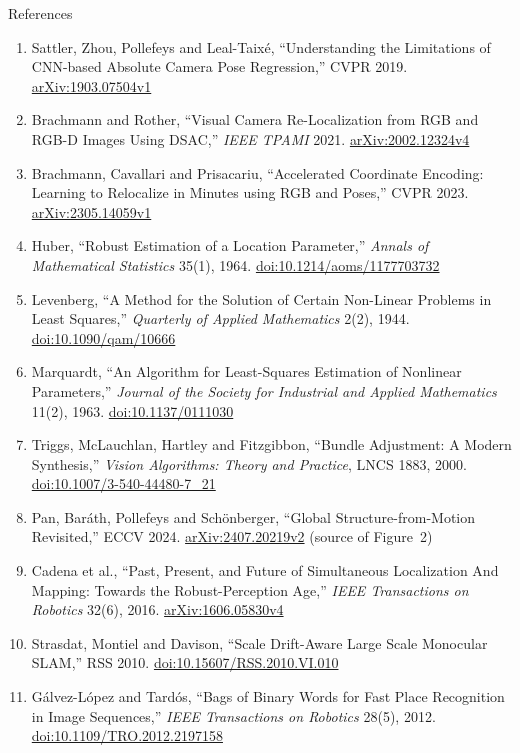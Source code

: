\begin{frame}[allowframebreaks]{References}
\begin{enumerate}
    \item Sattler, Zhou, Pollefeys and Leal-Taix\'e, ``Understanding the Limitations of CNN-based Absolute Camera Pose Regression,'' CVPR 2019. \href{https://arxiv.org/abs/1903.07504v1}{arXiv:1903.07504v1}
    \item Brachmann and Rother, ``Visual Camera Re-Localization from RGB and RGB-D Images Using DSAC,'' \emph{IEEE TPAMI} 2021. \href{https://arxiv.org/abs/2002.12324v4}{arXiv:2002.12324v4}
    \item Brachmann, Cavallari and Prisacariu, ``Accelerated Coordinate Encoding: Learning to Relocalize in Minutes using RGB and Poses,'' CVPR 2023. \href{https://arxiv.org/abs/2305.14059v1}{arXiv:2305.14059v1}
    \item Huber, ``Robust Estimation of a Location Parameter,'' \emph{Annals of Mathematical Statistics} 35(1), 1964. \href{https://doi.org/10.1214/aoms/1177703732}{doi:10.1214/aoms/1177703732}
    \item Levenberg, ``A Method for the Solution of Certain Non-Linear Problems in Least Squares,'' \emph{Quarterly of Applied Mathematics} 2(2), 1944. \href{https://doi.org/10.1090/qam/10666}{doi:10.1090/qam/10666}
    \item Marquardt, ``An Algorithm for Least-Squares Estimation of Nonlinear Parameters,'' \emph{Journal of the Society for Industrial and Applied Mathematics} 11(2), 1963. \href{https://doi.org/10.1137/0111030}{doi:10.1137/0111030}
    \item Triggs, McLauchlan, Hartley and Fitzgibbon, ``Bundle Adjustment: A Modern Synthesis,'' \emph{Vision Algorithms: Theory and Practice}, LNCS 1883, 2000. \href{https://doi.org/10.1007/3-540-44480-7_21}{doi:10.1007/3-540-44480-7\_21}
    \item Pan, Bar\'ath, Pollefeys and Sch\"onberger, ``Global Structure-from-Motion Revisited,'' ECCV 2024. \href{https://arxiv.org/abs/2407.20219v2}{arXiv:2407.20219v2} (source of Figure~2)
    \item Cadena et al., ``Past, Present, and Future of Simultaneous Localization And Mapping: Towards the Robust-Perception Age,'' \emph{IEEE Transactions on Robotics} 32(6), 2016. \href{https://arxiv.org/abs/1606.05830v4}{arXiv:1606.05830v4}
    \item Strasdat, Montiel and Davison, ``Scale Drift-Aware Large Scale Monocular SLAM,'' RSS 2010. \href{https://doi.org/10.15607/RSS.2010.VI.010}{doi:10.15607/RSS.2010.VI.010}
    \item G\'alvez-L\'opez and Tard\'os, ``Bags of Binary Words for Fast Place Recognition in Image Sequences,'' \emph{IEEE Transactions on Robotics} 28(5), 2012. \href{https://doi.org/10.1109/TRO.2012.2197158}{doi:10.1109/TRO.2012.2197158}

\end{enumerate}
\end{frame}
